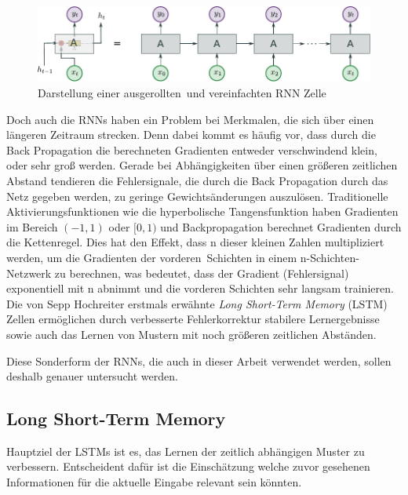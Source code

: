                 \begin{figure}[ht]
                    \centering
                    \includegraphics[width=1\textwidth]{images/Illustrationen/RNN_enrolled}
                    \caption{Darstellung einer \glqq ausgerollten\grqq \ und vereinfachten RNN Zelle}
                    \label{fig:RNN_enroled}
                \end{figure}
            Doch auch die RNNs haben ein Problem bei Merkmalen, die sich über einen längeren Zeitraum strecken.
            Denn dabei kommt es häufig vor, dass durch die Back Propagation die berechneten Gradienten entweder verschwindend klein, oder sehr groß werden.
            Gerade bei Abhängigkeiten über einen größeren zeitlichen Abstand tendieren die Fehlersignale,
            die durch die Back Propagation durch das Netz gegeben werden, zu geringe Gewichtsänderungen auszulösen.
            Traditionelle Aktivierungsfunktionen wie die hyperbolische Tangensfunktion haben Gradienten im Bereich $(-1,1)$ oder $[0,1)$ und Backpropagation berechnet Gradienten durch die Kettenregel.
            Dies hat den Effekt, dass n dieser kleinen Zahlen multipliziert werden, um die Gradienten der \glqq vorderen\grqq \ Schichten in einem n-Schichten-Netzwerk zu berechnen, was bedeutet, dass der Gradient (Fehlersignal) exponentiell mit n abnimmt und die vorderen Schichten sehr langsam trainieren.
            Die von Sepp Hochreiter erstmals erwähnte \textit{Long Short-Term Memory} (LSTM) Zellen ermöglichen durch verbesserte Fehlerkorrektur stabilere Lernergebnisse sowie auch das Lernen von Mustern mit noch größeren zeitlichen Abständen.~\cite{HOCHREITER1998}

            Diese Sonderform der RNNs, die auch in dieser Arbeit verwendet werden, sollen deshalb genauer untersucht werden.
   	
        \subsection{Long Short-Term Memory} 
            Hauptziel der LSTMs ist es, das Lernen der zeitlich abhängigen Muster zu verbessern.
            Entscheident dafür ist die Einschätzung welche zuvor gesehenen Informationen für die aktuelle Eingabe relevant sein könnten.
            
